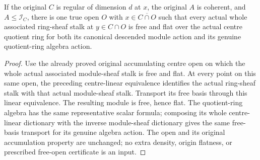 \begin{theorem}
\label{hir:real-domain-original-actual-normal-associated-ring-sheaf-free-open}
\leanok
If the original $C$ is regular of dimension $d$ at $x$, the original
$A$ is coherent, and $A\leq\mathcal I_C$, there is one true open $O$
with $x\in\overline{C\cap O}$ such that every actual whole associated
ring-sheaf stalk at $y\in C\cap O$ is free and flat over the actual
centre quotient ring for both its canonical descended module action and
its genuine quotient-ring algebra action.
\end{theorem}
\begin{proof}
Use the already proved original accumulating centre open on which the
whole actual associated module-sheaf stalk is free and flat. At every
point on this same open, the preceding centre-linear equivalence
identifies the actual ring-sheaf stalk with that actual module-sheaf
stalk. Transport its free basis through this linear equivalence. The
resulting module is free, hence flat. The quotient-ring algebra has the
same representative scalar formula; composing its whole centre-linear
dictionary with the inverse module-sheaf dictionary gives the same
free-basis transport for its genuine algebra action. The open and its original
accumulation property are unchanged; no extra density, origin flatness,
or prescribed free-open certificate is an input.
\end{proof}
